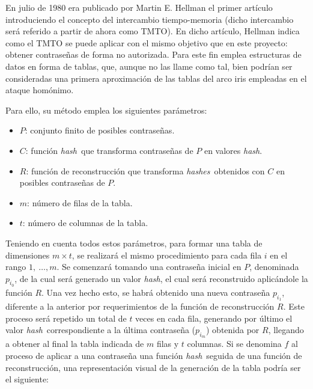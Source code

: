 \documentclass[12pt,spanish,listoffigures,listoftables]{tfgetsinf}
\newcommand{\hash}{\textit{hash}}
\newcommand{\hashes}{\textit{hashes}}
\begin{document}
En julio de 1980 era publicado por Martin E. Hellman el primer artículo introduciendo el concepto del intercambio tiempo-memoria (dicho intercambio será referido a partir de ahora como TMTO). En dicho artículo, Hellman indica como el TMTO se puede aplicar con el mismo objetivo que en este proyecto: obtener contraseñas de forma no autorizada. Para este fin emplea estructuras de datos en forma de tablas, que, aunque no las llame como tal, bien podrían ser consideradas una primera aproximación de las tablas del arco iris empleadas en el ataque homónimo. 

Para ello, su método emplea los siguientes parámetros:
\begin{itemize}

    \item $P$: conjunto finito de posibles contraseñas.
    
    \item $C$: función \hash~que transforma contraseñas de $P$ en valores \hash.
    
    \item $R$: función de reconstrucción que transforma \hashes~obtenidos con $C$ en posibles contraseñas de $P$.
    
    \item $m$: número de filas de la tabla.
    
    \item $t$: número de columnas de la tabla.
\end{itemize}

Teniendo en cuenta todos estos parámetros, para formar una tabla de dimensiones $m \times t$, se realizará el mismo procedimiento para cada fila $i$ en el rango $1,~\dots, m$. Se comenzará tomando una contraseña inicial en $P$, denominada $p_{i_0}$, de la cual será generado un valor \hash, el cual será reconstruido aplicándole la función $R$. Una vez hecho esto, se habrá obtenido una nueva contraseña $p_{i_1}$, diferente a la anterior por requerimientos de la función de reconstrucción $R$. Este proceso será repetido un total de $t$ veces en cada fila, generando por último el valor \hash~correspondiente a la última contraseña ($p_{i_m}$) obtenida por $R$, llegando a obtener al final la tabla indicada de $m$ filas y $t$ columnas. Si se denomina $f$ al proceso de aplicar a una contraseña una función \hash~seguida de una función de reconstrucción, una representación visual de la generación de la tabla podría ser el siguiente:\\
\end{document}

